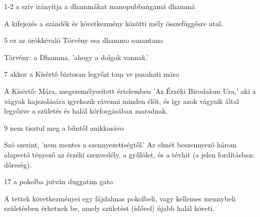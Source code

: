 
\begin{notesdescription}

\item[{1-2}
{a szív irányítja a dhammákat}
{manopubbaṅgamā dhammā}] \hfill\par

A kifejezés a szándék és következmény közötti mély összefüggésre utal.

\item[{5}
{ez az örökkévaló Törvény}
{esa dhammo sanantano}] \hfill\par

Törvény: a Dhamma, 'ahogy a dolgok vannak.'

\item[{7}
{akkor a Kísértő biztosan legyőzi}
{taṃ ve pasahati māro}] \hfill\par

A Kísértő: Mára, megszemélyesített értelemben 'Az Érzéki Birodalom Ura,' aki a vágyak hajszolására igyekszik rávenni minden élőt, és így azok vágyaik által legyőzve a születés és halál körforgásában maradnak.

\item[{9}
{nem tisztul meg a bűntől}
{anikkasāvo}] \hfill\par

Szó szerint, 'nem mentes a szennyezettségtől.' Az elmét beszennyező három alapvető tényező az érzéki szenvedély, a gyűlölet, és a tévhit (a jelen fordításban: dőreség).

\item[{17}
{a pokolba jutván}
{duggatiṃ gato}] \hfill\par

A tettek következményei egy fájdalmas pokolbeli, vagy kellemes mennybeli születésben érhetnek be, amely születést (idővel) újabb halál követi.

\end{notesdescription}

